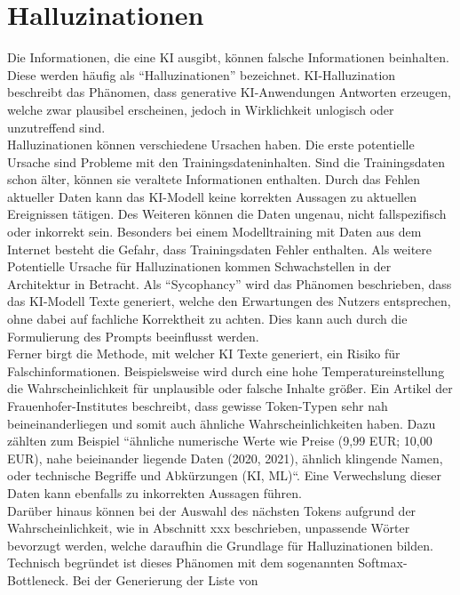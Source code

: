 \documentclass[../main.tex]{subfiles}
\begin{document}
\section{Halluzinationen}

Die Informationen, die eine KI ausgibt, können falsche Informationen beinhalten. Diese werden häufig als “Halluzinationen” bezeichnet. KI-Halluzination beschreibt 
das Phänomen, dass generative KI-Anwendungen Antworten erzeugen, welche zwar plausibel erscheinen, jedoch in Wirklichkeit unlogisch oder unzutreffend sind\cite{hallucinationForewarning}.\\
Halluzinationen können verschiedene Ursachen haben. Die erste potentielle Ursache sind Probleme mit den Trainingsdateninhalten. Sind die Trainingsdaten schon älter,
können sie veraltete Informationen enthalten. Durch das Fehlen aktueller Daten kann das KI-Modell keine korrekten Aussagen zu aktuellen Ereignissen tätigen. Des 
Weiteren können die Daten ungenau, nicht fallspezifisch oder inkorrekt sein. Besonders bei einem Modelltraining mit Daten aus dem Internet besteht die Gefahr, dass 
Trainingsdaten Fehler enthalten. Als weitere Potentielle Ursache für Halluzinationen kommen Schwachstellen in der Architektur in Betracht. Als “Sycophancy” wird das 
Phänomen beschrieben, dass das KI-Modell Texte generiert, welche den Erwartungen des Nutzers entsprechen, ohne dabei auf fachliche Korrektheit zu achten. Dies kann auch 
durch die Formulierung des Prompts beeinflusst werden.\cite{allgemHalluzinationen} \\
Ferner birgt die Methode, mit welcher KI Texte generiert, ein Risiko für Falschinformationen. Beispielsweise wird durch eine hohe Temperatureinstellung die 
Wahrscheinlichkeit für unplausible oder falsche Inhalte größer. Ein Artikel der Frauenhofer-Institutes beschreibt, dass gewisse Token-Typen sehr nah beineinanderliegen 
und somit auch ähnliche Wahrscheinlichkeiten haben. Dazu zählten zum Beispiel “ähnliche numerische Werte wie Preise (9,99 EUR; 10,00 EUR), nahe beieinander liegende 
Daten (2020, 2021), ähnlich klingende Namen, oder technische Begriffe und Abkürzungen (KI, ML)“\cite{halluzinationenFraunhofer}. Eine Verwechslung dieser Daten kann ebenfalls zu inkorrekten Aussagen 
führen.\\
Darüber hinaus können bei der Auswahl des nächsten Tokens aufgrund der Wahrscheinlichkeit, wie in Abschnitt xxx beschrieben, unpassende Wörter bevorzugt werden, welche 
daraufhin die Grundlage für Halluzinationen bilden. Technisch begründet ist dieses Phänomen mit dem sogenannten Softmax-Bottleneck. Bei der Generierung der Liste von 
\end{document}

